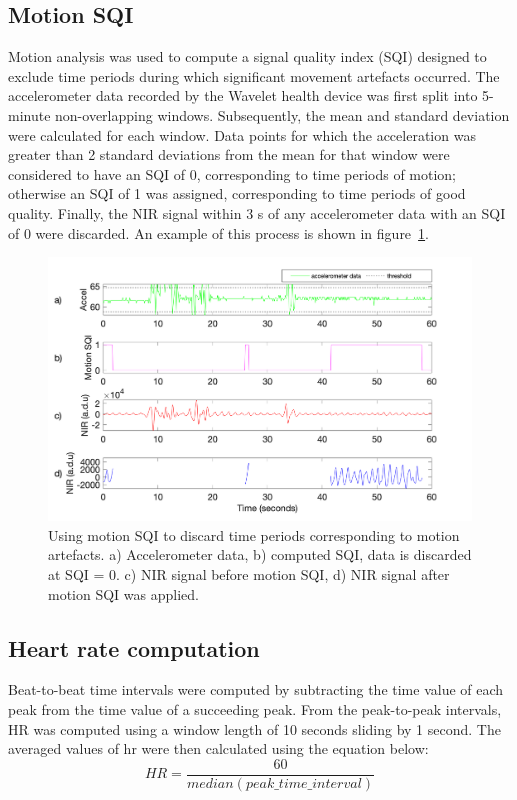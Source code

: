 \subsection{Motion SQI}

Motion analysis was used to compute a signal quality index (SQI) designed to exclude time periods during which significant movement artefacts occurred. The accelerometer data recorded by the Wavelet health device was first split into 5-minute non-overlapping windows. Subsequently, the mean and standard deviation were calculated for each window. Data points for which the acceleration was greater than \pm{}2 standard deviations from the mean for that window were considered to have an SQI of 0, corresponding to time periods of motion; otherwise an SQI of 1 was assigned, corresponding to time periods of good quality. Finally, the NIR signal within \pm{}3 s of any accelerometer data with an SQI of 0 were discarded. An example of this process is shown in figure~\ref{SQIACC}.


\begin{figure}[!ht]
\centering
\includegraphics[width=0.67\linewidth,keepaspectratio=true]{./figures/SQI.png}
    \caption[Using motion SQI to discard time periods corresponding to motion artefacts.]{Using motion SQI to discard time periods corresponding to motion artefacts. a) Accelerometer data, b) computed SQI, data is discarded at SQI = 0. c) NIR signal before motion SQI, d) NIR signal after motion SQI was applied.}
    \label{SQIACC}
\end{figure}

 \subsection{Heart rate computation}
 
Beat-to-beat time intervals were computed by subtracting the time value of each peak from the time value of a succeeding peak.
From the peak-to-peak intervals, HR was computed using a window length of 10 seconds sliding by 1 second. The averaged values of \gls{hr} were then calculated using the equation below:
\begin{equation}
HR = \frac{60}{median (peak\_time\_interval)}
\end{equation}
 
